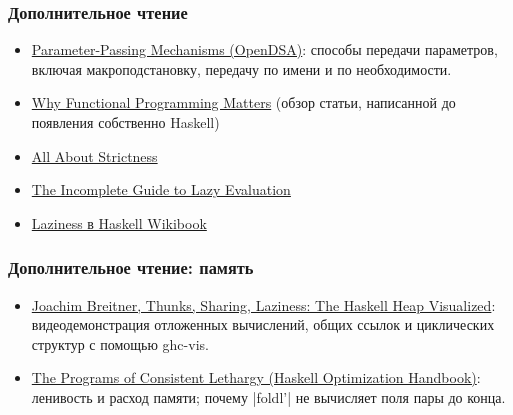 \documentclass[11pt]{beamer}
\begin{document}
\begin{frame}[fragile]
  \frametitle{Дополнительное чтение}
  \begin{itemize}
    \item \href{https://opendsa-server.cs.vt.edu/ODSA/Books/uwosh/cs-331/spring-2020/PL_Book_Spr_2020/html/SLang2ParameterPassing.html}{Parameter-Passing Mechanisms (OpenDSA)}: способы передачи параметров, включая макроподстановку, передачу по имени и по необходимости.
    \item \href{https://blog.acolyer.org/2016/09/14/why-functional-programming-matters/}{Why Functional Programming Matters} (обзор статьи, написанной до появления собственно Haskell)
    \item \href{https://web.archive.org/web/20230322115320/https://www.fpcomplete.com/blog/2017/09/all-about-strictness/}{All About Strictness}
    \item \href{https://apfelmus.nfshost.com/articles/lazy-eval.html}{The Incomplete Guide to Lazy Evaluation}
    \item \href{https://en.wikibooks.org/wiki/Haskell/Laziness}{Laziness в Haskell Wikibook}
  \end{itemize}
\end{frame}


\begin{frame}[fragile]
  \frametitle{Дополнительное чтение: память}
  \begin{itemize}
    \item \href{https://www.youtube.com/watch?v=I4lnCG18TaY}{Joachim Breitner, Thunks, Sharing, Laziness: The Haskell Heap Visualized}: видеодемонстрация отложенных вычислений, общих ссылок и циклических структур с помощью ghc-vis.
    \item \href{https://haskell.foundation/hs-opt-handbook.github.io/src/Preliminaries/what_makes_fast_hs.html}{The Programs of Consistent Lethargy (Haskell Optimization Handbook)}: ленивость и расход памяти; почему \haskinline|foldl'| не вычисляет поля пары до конца.
  \end{itemize}
\end{frame}
\end{document}
